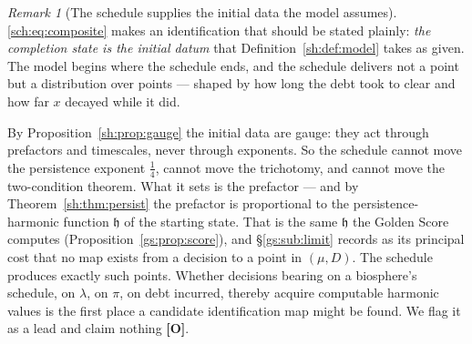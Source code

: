 \documentclass[11pt]{article}
\numberwithin{equation}{section}
\theoremstyle{plain}
\theoremstyle{definition}
\theoremstyle{remark}
\newtheorem{remark}[theorem]{Remark}
\newcommand{\hm}{\mathfrak{h}}
\begin{document}
\begin{remark}[The schedule supplies the initial data the model assumes]
\label{sch:rem:initialdata}
\eqref{sch:eq:composite} makes an identification that should be stated plainly:
\emph{the completion state is the initial datum} that
Definition~\ref{sh:def:model} takes as given. The model begins where the
schedule ends, and the schedule delivers not a point but a distribution
over points --- shaped by how long the debt took to clear and how far
$x$ decayed while it did.

By Proposition~\ref{sh:prop:gauge} the initial data are gauge: they act
through prefactors and timescales, never through exponents. So the
schedule cannot move the persistence exponent $\tfrac14$, cannot move
the trichotomy, and cannot move the two-condition theorem. What it sets
is the prefactor --- and by Theorem~\ref{sh:thm:persist} the prefactor
is proportional to the persistence-harmonic function $\hm$ of the
starting state. That is the same $\hm$ the Golden Score computes
(Proposition~\ref{gs:prop:score}), and \S\ref{gs:sub:limit} records as
its principal cost that no map exists from a decision to a point in
$(\mu,D)$. The schedule produces exactly such points. Whether decisions
bearing on a biosphere's schedule, on $\lambda$, on $\pi$, on debt
incurred, thereby acquire computable harmonic values is the first
place a candidate identification map might be found. We flag it as a
lead and claim nothing \textbf{[O]}.
\end{remark}
\end{document}
